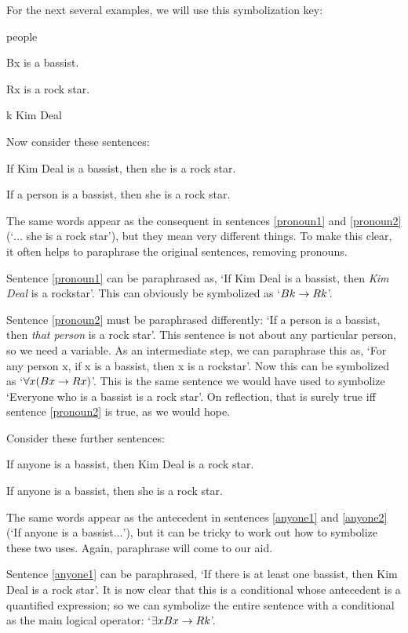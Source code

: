 For the next several examples, we will use this symbolization key:
	\begin{ekey}
		\item[\text{domain}] people
		\item[Bx]  is a bassist.
		\item[Rx]  is a rock star.
		\item[k] Kim Deal
	\end{ekey}
Now consider these sentences:
	\begin{earg}
		\item[\ex{pronoun1}] If Kim Deal is a bassist, then she is a rock star.
		\item[\ex{pronoun2}] If a person is a bassist, then she is a rock star.
	\end{earg}
The same words appear as the consequent in sentences \ref{pronoun1} and \ref{pronoun2} (`$\ldots$ she is a rock star'), but they mean very different things. To make this clear, it often helps to paraphrase the original sentences, removing pronouns.

Sentence \ref{pronoun1} can be paraphrased as, `If Kim Deal is a bassist, then \emph{Kim Deal} is a rockstar'. This can obviously be symbolized as `$Bk \rightarrow Rk$'.

Sentence \ref{pronoun2} must be paraphrased differently: `If a person is a bassist, then \emph{that person} is a rock star'. This sentence is not about any particular person, so we need a variable. As an intermediate step, we can paraphrase this as, `For any person x, if x is a bassist, then x is a rockstar'. Now this can be symbolized as `$\forall x (Bx \rightarrow Rx)$'. This is the same sentence we would have used to symbolize `Everyone who is a bassist is a rock star'. On reflection, that is surely true iff sentence \ref{pronoun2} is true, as we would hope.

Consider these further sentences:
	\begin{earg}
		\item[\ex{anyone1}] If anyone is a bassist, then Kim Deal is a rock star.
		\item[\ex{anyone2}] If anyone is a bassist, then she is a rock star.
	\end{earg}
The same words appear as the antecedent in sentences \ref{anyone1} and \ref{anyone2}  (`If anyone is a bassist$\ldots$'), but it can be tricky to work out how to symbolize these two uses. Again, paraphrase will come to our aid. 

Sentence \ref{anyone1} can be paraphrased, `If there is at least one bassist, then Kim Deal is a rock star'. It is now clear that this is a conditional whose antecedent is a quantified expression; so we can symbolize the entire sentence with a conditional as the main logical operator: `$\exists x Bx \rightarrow Rk$'.


